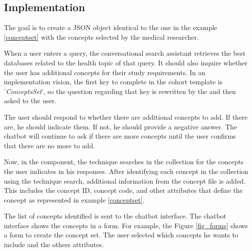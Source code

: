 \subsection{Implementation}




The goal is to create a JSON object identical to the one in the example \ref{conceptset} with the concepts selected by the medical researcher.

When a user enters a query, the conversational search assistant retrieves the best databases related to the health topic of that query. It should also inquire whether the user has additional concepts for their study requirements. In an implementation vision, the first key to complete in the cohort template is '\textit{ConceptsSet}', so the question regarding that key is rewritten by the {\llm} and then asked to the user.

The user should respond to whether there are additional concepts to add. If there are, he should indicate them. If not, he should provide a negative answer. The chatbot will continue to ask if there are more concepts until the user confirms that there are no more to add.

Now, in the {\ir} component, the {\bm} technique searches in the collection for the concepts the user indicates in his responses. After identifying each concept in the collection using the {\ir} technique search, additional information from the concept file is added. This includes the concept ID, concept code, and other attributes that define the concept as represented in example \ref{conceptset}.

The list of concepts identified is sent to the chatbot interface. The chatbot interface shows the concepts in a form. For example, the Figure \ref{fig_forms} shows a form to create the concept set. The user selected which concepts he wants to include and the others attributes.

